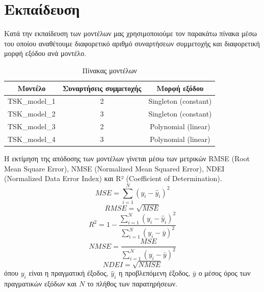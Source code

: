 \documentclass[12pt]{report}
\begin{document}
\section{Εκπαίδευση}
Κατά την εκπαίδευση των μοντέλων μας χρησιμοποιούμε τον παρακάτω πίνακα μέσω του οποίου αναθέτουμε διαφορετικό αριθμό συναρτήσεων συμμετοχής και διαφορετική μορφή εξόδου ανά μοντέλο.
\begin{table}[H]
    \centering
    \begin{tabular}{|c|c|c|}
        \hline
        \textbf{Μοντέλο} & \textbf{Συναρτήσεις συμμετοχής} & \textbf{Μορφή εξόδου} \\
        \hline
        TSK\_model\_1 & 2 & Singleton (constant) \\
        TSK\_model\_2 & 3 & Singleton (constant) \\
        TSK\_model\_3 & 2 & Polynomial (linear) \\
        TSK\_model\_4 & 3 & Polynomial (linear) \\
        \hline
    \end{tabular}
    \caption{Πίνακας μοντέλων}
    \label{tab:models}
\end{table}

Η εκτίμηση της απόδοσης των μοντέλων γίνεται μέσω των μετρικών RMSE (Root Mean Square Error), NMSE (Normalized Mean Squared Error), NDEI (Normalized Data Error Index) και R² (Coefficient of Determination). 
\begin{equation}
    MSE = \sum_{i=1}^{N} (y_i - \hat{y}_i)^2
    \label{eq:mse}
\end{equation}
\begin{equation}
    RMSE = \sqrt{MSE}
    \label{eq:rmse}
\end{equation}
\begin{equation}
    R^2 = 1 - \frac{\sum_{i=1}^{N} (y_i - \hat{y}_i)^2}{\sum_{i=1}^{N} (y_i - \bar{y})^2}
    \label{eq:r2}
\end{equation}
\begin{equation}
    NMSE = \frac{MSE}{\sum_{i=1}^{N} (y_i - \bar{y})^2}
    \label{eq:nmse}
\end{equation}
\begin{equation}
    NDEI = \sqrt{NMSE}
    \label{eq:ndei}
\end{equation}
όπου $y_i$ είναι η πραγματική έξοδος, $\hat{y}_i$ η προβλεπόμενη έξοδος, $\bar{y}$ ο μέσος όρος των πραγματικών εξόδων και $N$ το πλήθος των παρατηρήσεων.
\end{document}
